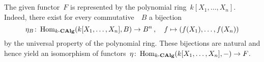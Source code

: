 \section{}





\subsection{}

The given functor~$F$ is represented by the polynomial ring~$k[X_1, \dotsc, X_n]$.
Indeed, there exist for every commutative~{\kalg}~$B$ a bijection
\[
          \eta_B
  \colon  \operatorname{Hom}_{\text{$k$-$\mathbf{CAlg}$}}(k[X_1, \dotsc, X_n], B)
  \to     B^n \,,
  \quad   f
  \mapsto ( f(X_1), \dotsc, f(X_n) )
\]
by the universal property of the polynomial ring.
These bijections are natural and hence yield an isomorphism of functors~$\eta \colon \operatorname{Hom}_{\text{$k$-$\mathbf{CAlg}$}}(k[X_1, \dotsc, X_n], -) \to F$.





\addtocounter{subsection}{1}





\subsection{}

